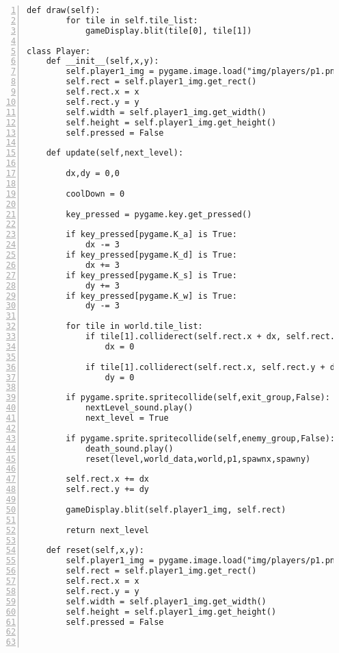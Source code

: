 \documentclass[12pt]{report}
\begin{document}
\begin{Verbatim}[numbers=left, frame=single]
    def draw(self):
        for tile in self.tile_list:
            gameDisplay.blit(tile[0], tile[1])

class Player:                                                                               
    def __init__(self,x,y):                                                                 
        self.player1_img = pygame.image.load("img/players/p1.png")                                  
        self.rect = self.player1_img.get_rect()
        self.rect.x = x
        self.rect.y = y
        self.width = self.player1_img.get_width()
        self.height = self.player1_img.get_height()
        self.pressed = False
	
    def update(self,next_level):                                                           

        dx,dy = 0,0                                                                         

        coolDown = 0

        key_pressed = pygame.key.get_pressed()

        if key_pressed[pygame.K_a] is True:                                                 
            dx -= 3
        if key_pressed[pygame.K_d] is True:
            dx += 3
        if key_pressed[pygame.K_s] is True:                                                 
            dy += 3
        if key_pressed[pygame.K_w] is True:                                                 
            dy -= 3

        for tile in world.tile_list:
            if tile[1].colliderect(self.rect.x + dx, self.rect.y, self.width, self.height):
                dx = 0

            if tile[1].colliderect(self.rect.x, self.rect.y + dy, self.width, self.height):
                dy = 0

        if pygame.sprite.spritecollide(self,exit_group,False):
            nextLevel_sound.play()
            next_level = True

        if pygame.sprite.spritecollide(self,enemy_group,False):
            death_sound.play()
            reset(level,world_data,world,p1,spawnx,spawny)

        self.rect.x += dx
        self.rect.y += dy

        gameDisplay.blit(self.player1_img, self.rect)

        return next_level

    def reset(self,x,y):
        self.player1_img = pygame.image.load("img/players/p1.png")                              
        self.rect = self.player1_img.get_rect()
        self.rect.x = x
        self.rect.y = y
        self.width = self.player1_img.get_width()
        self.height = self.player1_img.get_height()
        self.pressed = False



\end{Verbatim}
\end{document}
